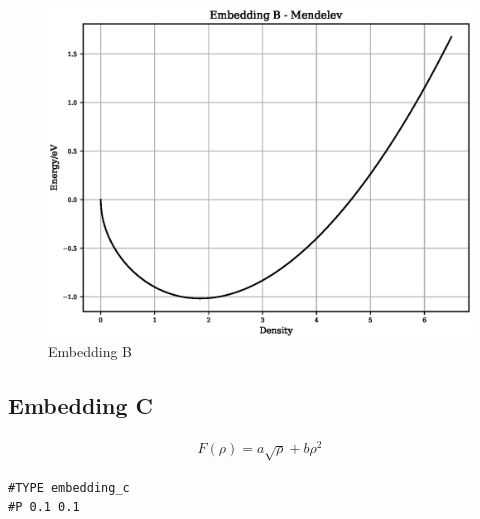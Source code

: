 \FloatBarrier
\begin{figure}[h]
  \begin{center}
    \includegraphics[scale=0.5]{appendix/functions/plots/embedding_b.eps}
    \caption{Embedding B}
    \label{graph:graph1}
  \end{center}
\end{figure}
\FloatBarrier









\subsection{Embedding C}

\begin{equation}
\begin{split}
F(\rho) = a \sqrt{\rho} + b \rho^2
\end{split}
\label{eq:embeddingC}
\end{equation}


\begin{lstlisting}[style=pseudocode,caption={Embedding C}]
#TYPE embedding_c
#P 0.1 0.1
\end{lstlisting}

